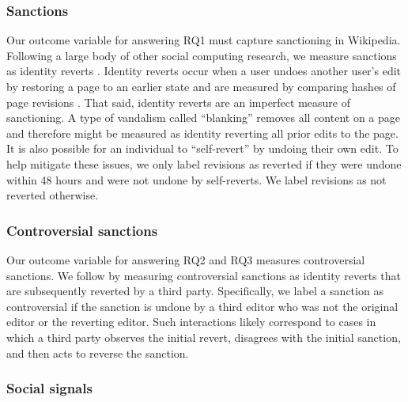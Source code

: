 \documentclass[format=acmsmall, natbib=true,  screen=true]{acmart}
\begin{document}
\subsubsection{Sanctions}


Our outcome variable for answering RQ1 must capture sanctioning in Wikipedia. Following a large body of other social computing research, we measure sanctions as identity reverts \citep[e.g.,][]{halfaker_dont_2011, halfaker_rise_2013, teblunthuis_revisiting_2018, piskorski_testing_2017}. Identity reverts occur when a user undoes another user's edit by restoring a page to an earlier state and are measured by comparing hashes of page revisions \citep{halfaker_dont_2011}. 
That said, identity reverts are an imperfect measure of sanctioning.  A type of vandalism called ``blanking'' removes all content on a page and therefore might be measured as identity reverting all prior edits to the page. It is also possible for an individual to ``self-revert'' by undoing their own edit. To help mitigate these issues, we only label revisions as reverted if they were undone within 48 hours and were not undone by self-reverts. We label revisions as not reverted otherwise.

\subsubsection{Controversial sanctions}
\label{sec:controversial}
Our outcome variable for answering RQ2 and RQ3 measures controversial sanctions. We follow \citet{piskorski_testing_2017} by measuring controversial sanctions as identity reverts that are subsequently reverted by a third party.  Specifically, we label a sanction as controversial if the sanction is undone by a third editor who was not the original editor or the reverting editor.  Such interactions likely correspond to cases in which a third party observes the initial revert, disagrees with the initial sanction, and then acts to reverse the sanction.


\subsubsection{Social signals}
\end{document}
